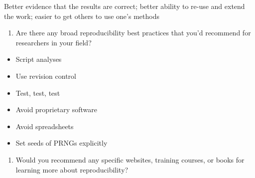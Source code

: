\documentclass[]{article}
\begin{document}
Better evidence that the results are correct; better ability to re-use
and extend the work; easier to get others to use one's methods

\begin{enumerate}
\def\labelenumi{\arabic{enumi})}
\setcounter{enumi}{4}
\itemsep1pt\parskip0pt
\item
  Are there any broad reproducibility best practices that you'd
  recommend for researchers in your field?
\end{enumerate}

\begin{itemize}
\itemsep1pt\parskip0pt
\item
  Script analyses
\item
  Use revision control
\item
  Test, test, test
\item
  Avoid proprietary software
\item
  Avoid spreadsheets
\item
  Set seeds of PRNGs explicitly
\end{itemize}

\begin{enumerate}
\def\labelenumi{\arabic{enumi})}
\setcounter{enumi}{5}
\itemsep1pt\parskip0pt
\item
  Would you recommend any specific websites, training courses, or books
  for learning more about reproducibility?
\end{enumerate}
\end{document}
